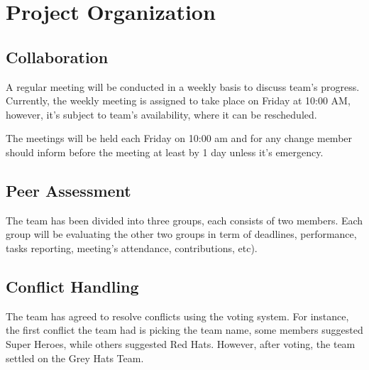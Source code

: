 \documentclass{article}
\begin{document}
\section{Project Organization}
\subsection{Collaboration}
A regular meeting will be conducted in a weekly basis to discuss team's progress. Currently, the weekly meeting is assigned to take place on Friday at 10:00 AM, however, it's subject to team's availability, where it can be rescheduled.

The meetings will be held each Friday on 10:00 am and for any change member should inform before the meeting at least by 1 day unless it's emergency.

\subsection{Peer Assessment}
The team has been divided into three groups, each consists of two members. Each group will be evaluating the other two groups in term of deadlines, performance, tasks reporting, meeting's attendance, contributions, etc).

\subsection{Conflict Handling}
The team has agreed to resolve conflicts using the voting system. For instance, the first conflict the team had is picking the team name, some members suggested Super Heroes, while others suggested Red Hats. However, after voting, the team settled on the Grey Hats Team.
\end{document}
